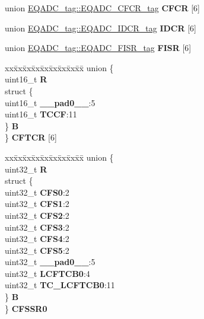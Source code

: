 \begin{DoxyCompactItemize}
\begin{tabbing}
\end{tabbing}\item 
\mbox{\label{structEQADC__tag_a4ae5ffc9fb169c1e61bfb439cd17abfc}} 
union \mbox{\hyperlink{unionEQADC__tag_1_1EQADC__CFCR__tag}{E\+Q\+A\+D\+C\+\_\+tag\+::\+E\+Q\+A\+D\+C\+\_\+\+C\+F\+C\+R\+\_\+tag}} {\bfseries C\+F\+CR} \mbox{[}6\mbox{]}
\item 
\mbox{\label{structEQADC__tag_ae92de09f0a4fd384f88792f6c9385acd}} 
union \mbox{\hyperlink{unionEQADC__tag_1_1EQADC__IDCR__tag}{E\+Q\+A\+D\+C\+\_\+tag\+::\+E\+Q\+A\+D\+C\+\_\+\+I\+D\+C\+R\+\_\+tag}} {\bfseries I\+D\+CR} \mbox{[}6\mbox{]}
\item 
\mbox{\label{structEQADC__tag_a8ff0adb41b8ad192ea9eb6f0ad2a13d4}} 
union \mbox{\hyperlink{unionEQADC__tag_1_1EQADC__FISR__tag}{E\+Q\+A\+D\+C\+\_\+tag\+::\+E\+Q\+A\+D\+C\+\_\+\+F\+I\+S\+R\+\_\+tag}} {\bfseries F\+I\+SR} \mbox{[}6\mbox{]}
\item 
\mbox{\label{structEQADC__tag_af8d97da519960fb5dbac70a939ae5f2f}} 
\begin{tabbing}
xx\=xx\=xx\=xx\=xx\=xx\=xx\=xx\=xx\=\kill
union \{\\
\>uint16\_t {\bfseries R}\\
\>struct \{\\
\>\>uint16\_t {\bfseries \_\_pad0\_\_}:5\\
\>\>uint16\_t {\bfseries TCCF}:11\\
\>\} {\bfseries B}\\
\} {\bfseries CFTCR} \mbox{[}6\mbox{]}\\

\end{tabbing}\item 
\mbox{\label{structEQADC__tag_a00a5fd14450216b67d8f93ddd18f178b}} 
\begin{tabbing}
xx\=xx\=xx\=xx\=xx\=xx\=xx\=xx\=xx\=\kill
union \{\\
\>uint32\_t {\bfseries R}\\
\>struct \{\\
\>\>uint32\_t {\bfseries CFS0}:2\\
\>\>uint32\_t {\bfseries CFS1}:2\\
\>\>uint32\_t {\bfseries CFS2}:2\\
\>\>uint32\_t {\bfseries CFS3}:2\\
\>\>uint32\_t {\bfseries CFS4}:2\\
\>\>uint32\_t {\bfseries CFS5}:2\\
\>\>uint32\_t {\bfseries \_\_pad0\_\_}:5\\
\>\>uint32\_t {\bfseries LCFTCB0}:4\\
\>\>uint32\_t {\bfseries TC\_LCFTCB0}:11\\
\>\} {\bfseries B}\\
\} {\bfseries CFSSR0}\\


\end{tabbing}
\end{DoxyCompactItemize}
